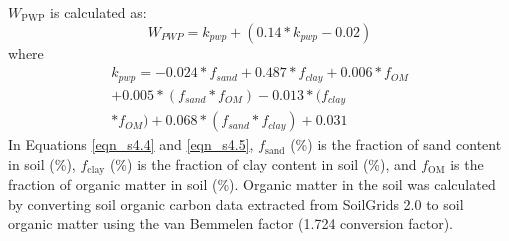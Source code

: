 \noindent $W_\mathrm{PWP}$ is calculated as:
\begin{equation}
    \label{eqn_s4.4} \tag{C$_4$.4}
    W_{PWP}=k_{pwp}+(0.14*k_{pwp}-0.02)	
\end{equation}
\noindent where
\begin{equation}
    \label{eqn_s4.5} \tag{C$_4$.5}
    \begin{aligned}
        k_{pwp} = -0.024 * f_{sand} + 0.487 * f_{clay} + 0.006 * f_{OM} \\ + 0.005 * (f_{sand} * f_{OM}) - 0.013 * (f_{clay} \\ * f_{OM}) + 0.068 * (f_{sand} * f_{clay}) + 0.031
    \end{aligned}
\end{equation}
\noindent In Equations \ref{eqn_s4.4} and \ref{eqn_s4.5}, $f_\mathrm{sand}$ (\%) is the fraction of sand content in soil (\%), $f_\mathrm{clay}$ (\%) is the fraction of clay content in soil (\%), and $f_\mathrm{OM}$ is the fraction of organic matter in soil (\%). Organic matter in the soil was calculated by converting soil organic carbon data extracted from SoilGrids 2.0 to soil organic matter using the van Bemmelen factor (1.724 conversion factor).
\clearpage



